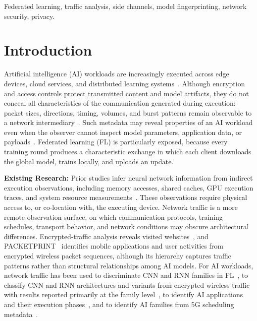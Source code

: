 \documentclass[conference]{IEEEtran}
\begin{document}
\begin{IEEEkeywords}
Federated learning, traffic analysis, side channels, model fingerprinting,
network security, privacy.
\end{IEEEkeywords}

\section{Introduction}
\label{sec:introduction}
Artificial intelligence (AI) workloads are increasingly executed across edge
devices, cloud services, and distributed learning
systems~\cite{zhou2019edge,mcmahan2017communication}. Although encryption and
access controls protect transmitted content and model artifacts, they do not
conceal all characteristics of the communication generated during execution:
packet sizes, directions, timing, volumes, and burst patterns remain observable
to a network intermediary~\cite{sirinam2018deep}. Such metadata may reveal
properties of an AI workload even when the observer cannot inspect model
parameters, application data, or payloads~\cite{shuvo2025fingerprinting}.
Federated learning (FL) is particularly exposed, because every training round
produces a characteristic exchange in which each client downloads the global
model, trains locally, and uploads an update.

\textbf{Existing Research:} Prior studies infer neural network information from
indirect execution observations, including memory accesses, shared caches, GPU
execution traces, and system resource
measurements~\cite{hua2018reverse,yan2020cache,hu2020deepsniffer,patwari2022dnn}.
These observations require physical access to, or co-location with, the
executing device. Network traffic is a more remote observation surface, on which
communication protocols, training schedules, transport behavior, and network
conditions may obscure architectural differences. Encrypted-traffic analysis
reveals visited
websites~\cite{panchenko2011website,wang2014effective,hayes2016kfingerprinting,rimmer2018automated,sirinam2018deep},
and PACKETPRINT~\cite{li2022packet} identifies mobile applications and user
activities from encrypted wireless packet sequences, although its hierarchy
captures traffic patterns rather than structural relationships among AI models.
For AI workloads, network traffic has been used to discriminate CNN and RNN
families in FL~\cite{shuvo2025fingerprinting}, to classify CNN and RNN
architectures and variants from encrypted wireless traffic with results reported
primarily at the family level~\cite{shuvo2026flare}, to identify AI applications
and their execution phases~\cite{oyaniyi2026fingerprinting}, and to identify AI
families from 5G scheduling metadata~\cite{shuvo2026flint}.
\end{document}
